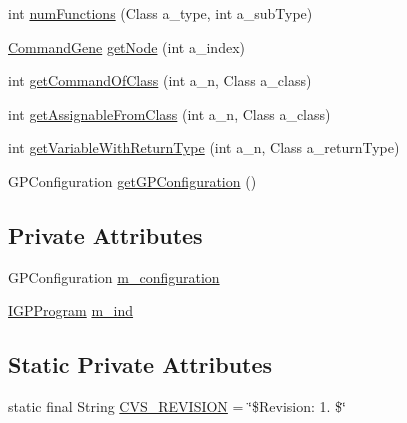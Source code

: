 \begin{DoxyCompactItemize}
\item 
int \hyperlink{classorg_1_1jgap_1_1gp_1_1_base_g_p_chromosome_a88ccabd79eb3647f41d073b48b10696d}{num\-Functions} (Class a\-\_\-type, int a\-\_\-sub\-Type)
\item 
\hyperlink{classorg_1_1jgap_1_1gp_1_1_command_gene}{Command\-Gene} \hyperlink{classorg_1_1jgap_1_1gp_1_1_base_g_p_chromosome_abb9145c6fb3601ff2b579f9789408258}{get\-Node} (int a\-\_\-index)
\item 
int \hyperlink{classorg_1_1jgap_1_1gp_1_1_base_g_p_chromosome_a92b35be05ab42231ab0842197332fde8}{get\-Command\-Of\-Class} (int a\-\_\-n, Class a\-\_\-class)
\item 
int \hyperlink{classorg_1_1jgap_1_1gp_1_1_base_g_p_chromosome_adbeb3b252e3e345b2f08b0377030179d}{get\-Assignable\-From\-Class} (int a\-\_\-n, Class a\-\_\-class)
\item 
int \hyperlink{classorg_1_1jgap_1_1gp_1_1_base_g_p_chromosome_a166411347ff6092fd2ba1c957893846d}{get\-Variable\-With\-Return\-Type} (int a\-\_\-n, Class a\-\_\-return\-Type)
\item 
G\-P\-Configuration \hyperlink{classorg_1_1jgap_1_1gp_1_1_base_g_p_chromosome_a57f6a4989aa1e01bda2c1f77cc086c4a}{get\-G\-P\-Configuration} ()
\end{DoxyCompactItemize}
\subsection*{Private Attributes}
\begin{DoxyCompactItemize}
\item 
G\-P\-Configuration \hyperlink{classorg_1_1jgap_1_1gp_1_1_base_g_p_chromosome_a1338f1d889a4190afaaca96b3f8896e3}{m\-\_\-configuration}
\item 
\hyperlink{interfaceorg_1_1jgap_1_1gp_1_1_i_g_p_program}{I\-G\-P\-Program} \hyperlink{classorg_1_1jgap_1_1gp_1_1_base_g_p_chromosome_abd0ec56e028878c736c081cea8dae1f7}{m\-\_\-ind}
\end{DoxyCompactItemize}
\subsection*{Static Private Attributes}
\begin{DoxyCompactItemize}
\item 
static final String \hyperlink{classorg_1_1jgap_1_1gp_1_1_base_g_p_chromosome_ae4c4327ee83f75b3cce9b14abb51c59c}{C\-V\-S\-\_\-\-R\-E\-V\-I\-S\-I\-O\-N} = \char`\"{}\$Revision\-: 1. \$\char`\"{}
\end{DoxyCompactItemize}
